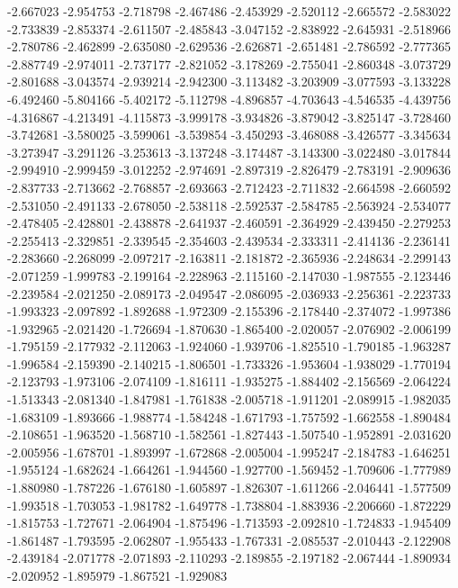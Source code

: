-2.667023
-2.954753
-2.718798
-2.467486
-2.453929
-2.520112
-2.665572
-2.583022
-2.733839
-2.853374
-2.611507
-2.485843
-3.047152
-2.838922
-2.645931
-2.518966
-2.780786
-2.462899
-2.635080
-2.629536
-2.626871
-2.651481
-2.786592
-2.777365
-2.887749
-2.974011
-2.737177
-2.821052
-3.178269
-2.755041
-2.860348
-3.073729
-2.801688
-3.043574
-2.939214
-2.942300
-3.113482
-3.203909
-3.077593
-3.133228
-6.492460
-5.804166
-5.402172
-5.112798
-4.896857
-4.703643
-4.546535
-4.439756
-4.316867
-4.213491
-4.115873
-3.999178
-3.934826
-3.879042
-3.825147
-3.728460
-3.742681
-3.580025
-3.599061
-3.539854
-3.450293
-3.468088
-3.426577
-3.345634
-3.273947
-3.291126
-3.253613
-3.137248
-3.174487
-3.143300
-3.022480
-3.017844
-2.994910
-2.999459
-3.012252
-2.974691
-2.897319
-2.826479
-2.783191
-2.909636
-2.837733
-2.713662
-2.768857
-2.693663
-2.712423
-2.711832
-2.664598
-2.660592
-2.531050
-2.491133
-2.678050
-2.538118
-2.592537
-2.584785
-2.563924
-2.534077
-2.478405
-2.428801
-2.438878
-2.641937
-2.460591
-2.364929
-2.439450
-2.279253
-2.255413
-2.329851
-2.339545
-2.354603
-2.439534
-2.333311
-2.414136
-2.236141
-2.283660
-2.268099
-2.097217
-2.163811
-2.181872
-2.365936
-2.248634
-2.299143
-2.071259
-1.999783
-2.199164
-2.228963
-2.115160
-2.147030
-1.987555
-2.123446
-2.239584
-2.021250
-2.089173
-2.049547
-2.086095
-2.036933
-2.256361
-2.223733
-1.993323
-2.097892
-1.892688
-1.972309
-2.155396
-2.178440
-2.374072
-1.997386
-1.932965
-2.021420
-1.726694
-1.870630
-1.865400
-2.020057
-2.076902
-2.006199
-1.795159
-2.177932
-2.112063
-1.924060
-1.939706
-1.825510
-1.790185
-1.963287
-1.996584
-2.159390
-2.140215
-1.806501
-1.733326
-1.953604
-1.938029
-1.770194
-2.123793
-1.973106
-2.074109
-1.816111
-1.935275
-1.884402
-2.156569
-2.064224
-1.513343
-2.081340
-1.847981
-1.761838
-2.005718
-1.911201
-2.089915
-1.982035
-1.683109
-1.893666
-1.988774
-1.584248
-1.671793
-1.757592
-1.662558
-1.890484
-2.108651
-1.963520
-1.568710
-1.582561
-1.827443
-1.507540
-1.952891
-2.031620
-2.005956
-1.678701
-1.893997
-1.672868
-2.005004
-1.995247
-2.184783
-1.646251
-1.955124
-1.682624
-1.664261
-1.944560
-1.927700
-1.569452
-1.709606
-1.777989
-1.880980
-1.787226
-1.676180
-1.605897
-1.826307
-1.611266
-2.046441
-1.577509
-1.993518
-1.703053
-1.981782
-1.649778
-1.738804
-1.883936
-2.206660
-1.872229
-1.815753
-1.727671
-2.064904
-1.875496
-1.713593
-2.092810
-1.724833
-1.945409
-1.861487
-1.793595
-2.062807
-1.955433
-1.767331
-2.085537
-2.010443
-2.122908
-2.439184
-2.071778
-2.071893
-2.110293
-2.189855
-2.197182
-2.067444
-1.890934
-2.020952
-1.895979
-1.867521
-1.929083

